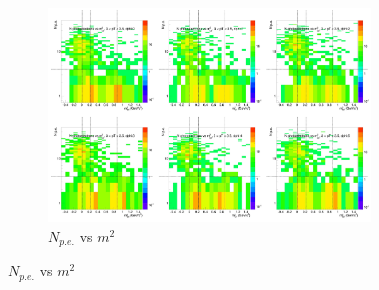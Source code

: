 \begin{figure}[H]
  \centering
    \begin{subfigure}{1\textwidth}
   \centering
   \includegraphics[width=0.94\textwidth]{hiptfits/pos/PSaccthreshold_cent0_ich1_accfire0_ptbin12.jpg}
    \caption{$N_{p.e.}$ vs $m^2$}
    \end{subfigure}
\end{figure}
